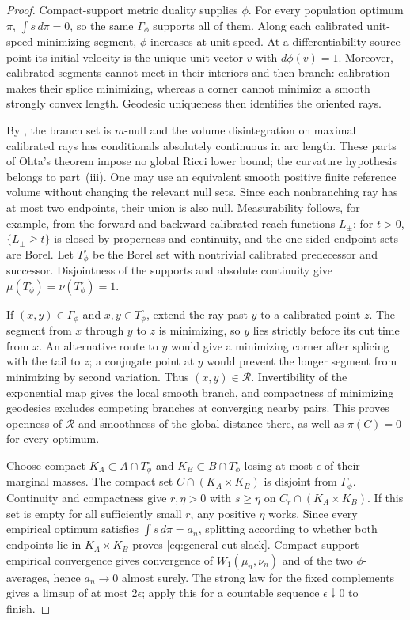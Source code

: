 \documentclass[11pt,reqno]{amsart}
\theoremstyle{definition}
\theoremstyle{remark}
\numberwithin{equation}{section}
\begin{document}
\begin{proof}
Compact-support metric duality supplies \(\phi\). For every
population optimum \(\pi\), \(\int s\,d\pi=0\), so the same
\(\Gamma_\phi\) supports all of them. Along each calibrated
unit-speed minimizing segment, \(\phi\) increases at unit speed.
At a differentiability source point its initial velocity is the
unique unit vector \(v\) with \(d\phi(v)=1\). Moreover, calibrated
segments cannot meet in their interiors and then branch: calibration
makes their splice minimizing, whereas a corner cannot minimize a
smooth strongly convex length. Geodesic uniqueness then identifies
the oriented rays.

By \cite[Theorem~1.1(i),(ii)]{OhtaNeedles}, the branch set is
\(m\)-null and the volume disintegration on maximal calibrated
rays has conditionals absolutely continuous in arc length.
These parts of Ohta's theorem impose no global Ricci lower bound;
the curvature hypothesis belongs to part~(iii).
One may use an equivalent smooth positive finite reference volume
without changing the relevant null sets. Since each nonbranching
ray has at most two endpoints, their union is also null.
Measurability follows, for example, from the forward and backward
calibrated reach functions \(L_\pm\): for \(t>0\),
\(\{L_\pm\ge t\}\) is closed by properness and continuity, and
the one-sided endpoint sets are Borel. Let \(T_\phi^\circ\) be
the Borel set with nontrivial calibrated predecessor and successor.
Disjointness of the supports and absolute continuity give
\(\mu(T_\phi^\circ)=\nu(T_\phi^\circ)=1\).

If \((x,y)\in\Gamma_\phi\) and \(x,y\in T_\phi^\circ\),
extend the ray past \(y\) to a calibrated point \(z\).
The segment from \(x\) through \(y\) to \(z\) is minimizing,
so \(y\) lies strictly before its cut time from \(x\).
An alternative route to \(y\) would give a minimizing corner
after splicing with the tail to \(z\); a conjugate point at \(y\)
would prevent the longer segment from minimizing by second variation.
Thus \((x,y)\in\mathcal R\). Invertibility of the exponential map
gives the local smooth branch, and compactness of minimizing
geodesics excludes competing branches at converging nearby pairs.
This proves openness of \(\mathcal R\) and smoothness of the
global distance there, as well as \(\pi(C)=0\) for every optimum.

Choose compact \(K_A\subset A\cap T_\phi^\circ\) and
\(K_B\subset B\cap T_\phi^\circ\) losing at most
\(\epsilon\) of their marginal masses. The compact set
\(C\cap(K_A\times K_B)\) is disjoint from \(\Gamma_\phi\).
Continuity and compactness give \(r,\eta>0\) with
\(s\ge\eta\) on \(C_r\cap(K_A\times K_B)\).
If this set is empty for all sufficiently small \(r\), any
positive \(\eta\) works. Since every empirical optimum satisfies
\(\int s\,d\pi=a_n\), splitting according to whether both
endpoints lie in \(K_A\times K_B\) proves
\eqref{eq:general-cut-slack}.
Compact-support empirical convergence gives convergence of
\(W_1(\mu_n,\nu_n)\) and of the two \(\phi\)-averages, hence
\(a_n\to0\) almost surely. The strong law for the fixed complements gives
a limsup of at most \(2\epsilon\); apply this for a countable
sequence \(\epsilon\downarrow0\) to finish.
\end{proof}
\end{document}
